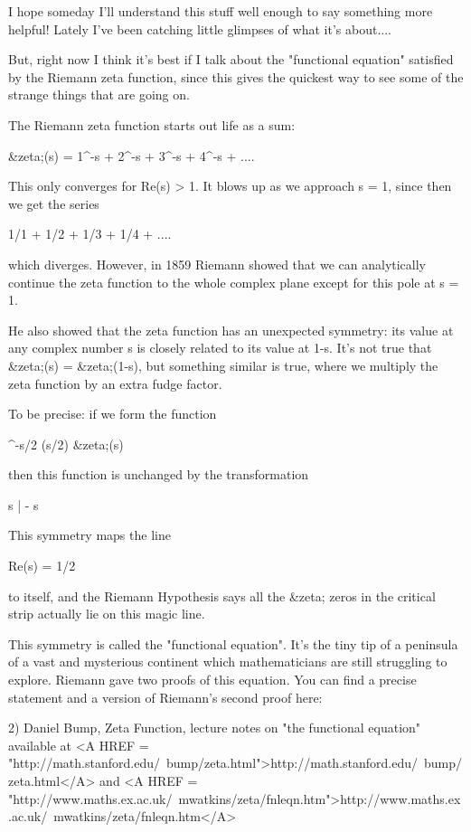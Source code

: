 I hope someday I'll understand this stuff well enough to say something more 
helpful!  Lately I've been catching little glimpses of what it's about....

But, right now I think it's best if I talk about the "functional equation" 
satisfied by the Riemann zeta function, since this gives the quickest way 
to see some of the strange things that are going on.

The Riemann zeta function starts out life as a sum:

&zeta;(s) = 1^{-s} + 2^{-s} + 3^{-s} + 4^{-s} + ....

This only converges for Re(s) > 1.  It blows up as we approach s = 1, 
since then we get the series

1/1 + 1/2 + 1/3 + 1/4 + ....

which diverges.  However, in 1859 Riemann showed that we can analytically 
continue the zeta function to the whole complex plane except for this pole 
at s = 1.  

He also showed that the zeta function has an unexpected symmetry: 
its value at any complex number s is closely related to its value at 1-s.  
It's not true that &zeta;(s) = &zeta;(1-s), but something similar is true, 
where we multiply the zeta function by an extra fudge factor.  

To be precise: if we form the function

\pi ^{-s/2} \Gamma (s/2) &zeta;(s)

then this function is unchanged by the transformation

s | - s

This symmetry maps the line 

Re(s) = 1/2

to itself, and the Riemann Hypothesis says all the &zeta; zeros in 
the critical strip actually lie on this magic line.  

This symmetry is called the "functional equation".  It's the tiny tip of a 
peninsula of a vast and mysterious continent which mathematicians are still 
struggling to explore.  Riemann gave two proofs of this equation.  You can 
find a precise statement and a version of Riemann's second proof here:

2) Daniel Bump, Zeta Function, lecture notes on "the functional
equation" available at <A HREF = "http://math.stanford.edu/~bump/zeta.html">http://math.stanford.edu/~bump/zeta.html</A>
and <A HREF = "http://www.maths.ex.ac.uk/~mwatkins/zeta/fnleqn.htm">http://www.maths.ex.ac.uk/~mwatkins/zeta/fnleqn.htm</A>

